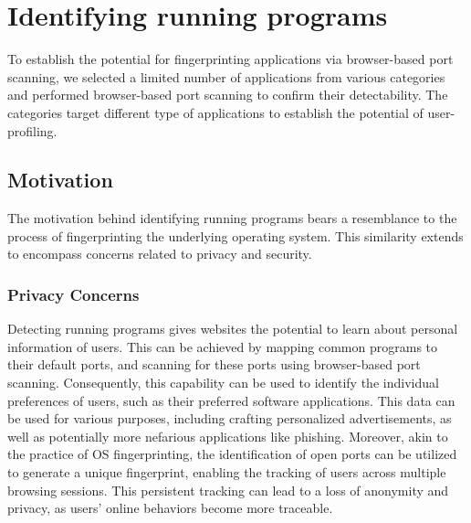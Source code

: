 
\section{Identifying running programs}

To establish the potential for fingerprinting applications via browser-based port scanning, we selected a limited number of applications from various categories and performed browser-based port scanning to confirm their detectability. The categories target different type of applications to establish the potential of user-profiling.

\subsection{Motivation}

The motivation behind identifying running programs bears a resemblance to the process of fingerprinting the underlying operating system. This similarity extends to encompass concerns related to privacy and security.

\subsubsection{Privacy Concerns}

Detecting running programs gives websites the potential to learn about personal information of users. This can be achieved by mapping common programs to their default ports, and scanning for these ports using browser-based port scanning. Consequently, this capability can be used to identify the individual preferences of users, such as their preferred software applications. This data can be used for various purposes, including crafting personalized advertisements, as well as potentially more nefarious applications like phishing.
Moreover, akin to the practice of OS fingerprinting, the identification of open ports can be utilized to generate a unique fingerprint, enabling the tracking of users across multiple browsing sessions. This persistent tracking can lead to a loss of anonymity and privacy, as users' online behaviors become more traceable.

